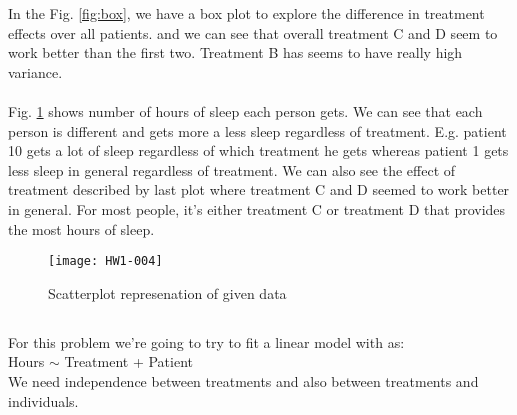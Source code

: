 \documentclass{article}
\begin{document}
In the Fig. \ref{fig:box}, we have a box plot to explore the difference in treatment effects over all patients. and we can see that overall treatment C and D seem to work better than the first two. Treatment B has seems to have really high variance.\\
\\
Fig. \ref{fig:2b} shows number of hours of sleep each person gets. We can see that each person is different and gets more a less sleep regardless of treatment. E.g. patient 10 gets a lot of sleep regardless of which treatment he gets whereas patient 1 gets less sleep in general regardless of treatment. We can also see the effect of treatment described by last plot where treatment C and D seemed to work better in general. For most people, it's either treatment C or treatment D that provides the most hours of sleep.

\begin{figure}[ht]
\texttt{[image: HW1-004]}
\caption{Scatterplot represenation of given data}
\label{fig:2b}
\end{figure}
\newpage{}
\subsection{}
For this problem we're going to try to fit a linear model with as:\\
Hours $\sim$ Treatment + Patient\\

We need independence between treatments and also between treatments and individuals.
\end{document}
